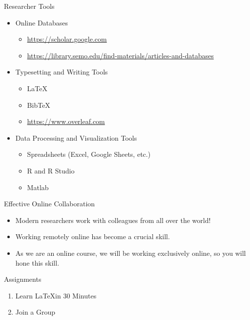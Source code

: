 \documentclass[handout]{beamer}
\begin{document}
\begin{frame}{Researcher Tools}
    \begin{itemize}
        \item Online Databases
        \begin{itemize}
            \item \url{https://scholar.google.com}
            \item \url{https://library.semo.edu/find-materials/articles-and-databases}
        \end{itemize}
        \item Typesetting and Writing Tools
        \begin{itemize}
            \item \LaTeX
            \item BibTeX
            \item \url{https://www.overleaf.com}
        \end{itemize}
        \item Data Processing and Visualization Tools
        \begin{itemize}
            \item Spreadsheets (Excel, Google Sheets, etc.)
            \item R and R Studio
            \item Matlab
        \end{itemize}
    \end{itemize}
\end{frame}

\begin{frame}{Effective Online Collaboration}
    \begin{itemize}
        \item Modern researchers work with colleagues from all over the world!
        \item Working remotely online has become a crucial skill.
        \item As we are an online course, we will be working exclusively online, so you will hone this skill.
    \end{itemize}
\end{frame}

\begin{frame}{Assignments}
    \begin{enumerate}
        \item Learn \LaTeX in 30 Minutes 
        \item Join a Group
    \end{enumerate}
\end{frame}
\end{document}
